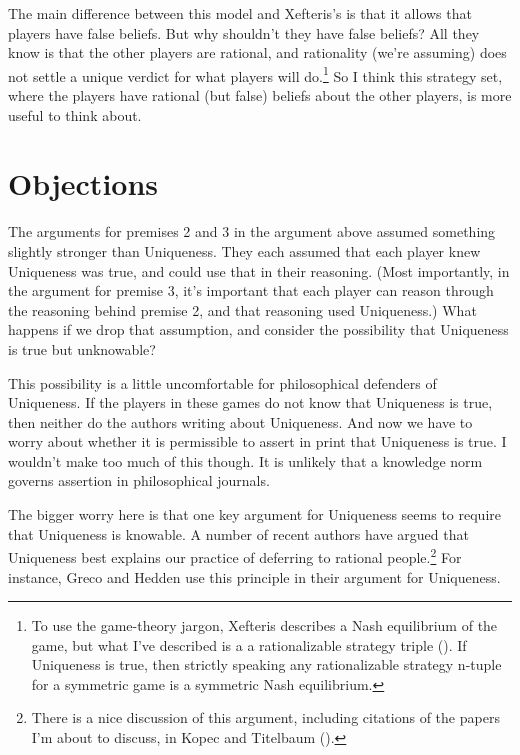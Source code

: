 \documentclass[
  10pt,
  letterpaper,
  DIV=11,
  numbers=noendperiod,
  twoside]{scrartcl}
\begin{document}
The main difference between this model and Xefteris's is that it allows
that players have false beliefs. But why shouldn't they have false
beliefs? All they know is that the other players are rational, and
rationality (we're assuming) does not settle a unique verdict for what
players will do.\footnote{To use the game-theory jargon, Xefteris
  describes a Nash equilibrium of the game, but what I've described is a
  a rationalizable strategy triple (). If Uniqueness is true, then strictly speaking any
  rationalizable strategy n-tuple for a symmetric game is a symmetric
  Nash equilibrium.} So I think this strategy set, where the players
have rational (but false) beliefs about the other players, is more
useful to think about.

\section{Objections}\label{objections}

The arguments for premises 2 and 3 in the argument above assumed
something slightly stronger than Uniqueness. They each assumed that each
player knew Uniqueness was true, and could use that in their reasoning.
(Most importantly, in the argument for premise 3, it's important that
each player can reason through the reasoning behind premise 2, and that
reasoning used Uniqueness.) What happens if we drop that assumption, and
consider the possibility that Uniqueness is true but unknowable?

This possibility is a little uncomfortable for philosophical defenders
of Uniqueness. If the players in these games do not know that Uniqueness
is true, then neither do the authors writing about Uniqueness. And now
we have to worry about whether it is permissible to assert in print that
Uniqueness is true. I wouldn't make too much of this though. It is
unlikely that a knowledge norm governs assertion in philosophical
journals.

The bigger worry here is that one key argument for Uniqueness seems to
require that Uniqueness is knowable. A number of recent authors have
argued that Uniqueness best explains our practice of deferring to
rational people.\footnote{There is a nice discussion of this argument,
  including citations of the papers I'm about to discuss, in Kopec and
  Titelbaum ().} For
instance, Greco and Hedden use this principle in their argument for
Uniqueness.
\end{document}
